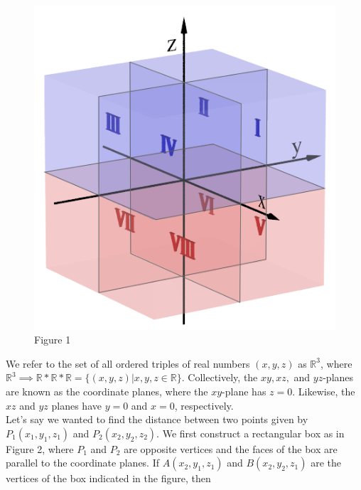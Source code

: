 \documentclass{article}
\begin{document}
            \begin{figure} [hbt!]
                \centering
                \includegraphics[scale=0.3]{Resources/Unit3Vectors/Octants.png}
                \caption*{Figure 1}
            \end{figure}

            \noindent We refer to the set of all ordered triples of real numbers $(x,y,z)$ as
            $\mathbb{R}^3$, where
            $\mathbb{R}^3\implies\mathbb{R}*\mathbb{R}*\mathbb{R}=\{(x,y,z)|x,y,z\in\mathbb{R}\}$.
            Collectively, the $xy, xz,$ and $yz$-planes are known as the coordinate planes, where
            the $xy$-plane has $z=0$. Likewise, the $xz$ and $yz$ planes have $y=0$ and $x = 0$,
            respectively. \\

            \noindent Let's say we wanted to find the distance between two points given by
            $P_1(x_1,y_1,z_1)$ and $P_2(x_2,y_2,z_2)$. We first construct a rectangular box as
            in Figure 2, where $P_1$ and $P_2$ are opposite vertices and the faces of the box are
            parallel to the coordinate planes. If $A(x_2,y_1,z_1)$ and $B(x_2,y_2,z_1)$ are the
            vertices of the box indicated in the figure, then
\end{document}
